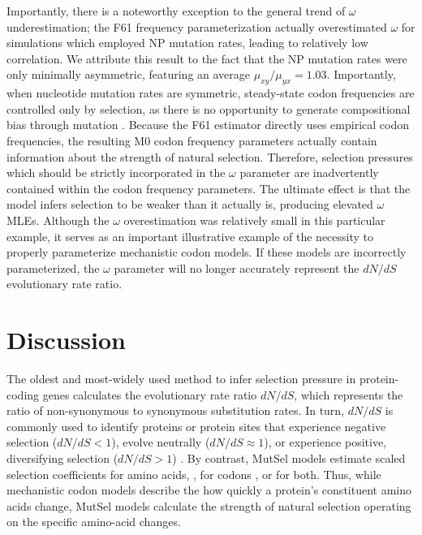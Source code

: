 \documentclass{pnastwo}
\begin{document}
Importantly, there is a noteworthy exception to the general trend of $\omega$ underestimation; the F61 frequency parameterization actually overestimated $\omega$ for simulations which employed NP mutation rates, leading to relatively low correlation. We attribute this result to the fact that the NP mutation rates were only minimally asymmetric, featuring an average $\mu_{xy}/\mu_{yx} = 1.03$. Importantly, when nucleotide mutation rates are symmetric, steady-state codon frequencies are controlled only by selection, as there is no opportunity to generate compositional bias through mutation \cite{SellaHirsh2005}. Because the F61 estimator directly uses empirical codon frequencies, the resulting M0 codon frequency parameters actually contain information about the strength of natural selection. Therefore, selection pressures which should be strictly incorporated in the $\omega$ parameter are inadvertently contained within the codon frequency parameters. The ultimate effect is that the model infers selection to be weaker than it actually is, producing elevated $\omega$ MLEs. Although the $\omega$ overestimation was relatively small in this particular example, it serves as an important illustrative example of the necessity to properly parameterize mechanistic codon models. If these models are incorrectly parameterized, the $\omega$ parameter will no longer accurately represent the $dN/dS$ evolutionary rate ratio.



\section*{Discussion}


The oldest and most-widely used method to infer selection pressure in protein-coding genes calculates the evolutionary rate ratio $dN/dS$, which represents the ratio of non-synonymous to synonymous substitution rates. In turn, $dN/dS$ is commonly used to identify proteins or protein sites that experience negative selection ($dN/dS<1$), evolve neutrally ($dN/dS\approx1$), or experience positive, diversifying selection ($dN/dS>1$) \cite{NielsenYang1998, Yangetal2000, KosakovskyPondFrost2005}. By contrast, MutSel models estimate scaled selection coefficients for amino acids, \cite{HalpernBruno1998,YangNielsen2008,Rodrigueetal2010,Tamurietal2012,Tamurietal2014}, for codons \cite{YangNielsen2008}, or for both. Thus, while mechanistic codon models describe the how quickly a protein's constituent amino acids change, MutSel models calculate the strength of natural selection operating on the specific amino-acid changes.  
\end{document}
